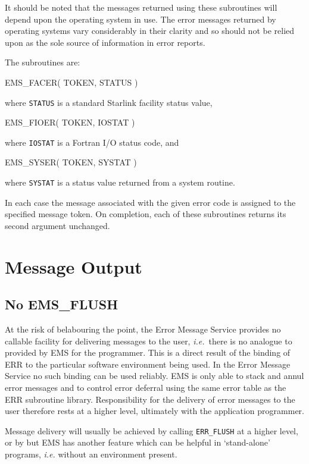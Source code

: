 \documentclass[twoside,11pt]{starlink}
\begin{document}
It should be noted that the messages returned using these subroutines
will depend upon the operating system in use.
The error messages returned by operating systems vary considerably in their
clarity and so should not be relied upon as the sole source of information
in error reports.

The subroutines are:
\begin{terminalv}
EMS_FACER( TOKEN, STATUS )
\end{terminalv}
where \texttt{STATUS} is a standard Starlink facility status value,
\begin{terminalv}
EMS_FIOER( TOKEN, IOSTAT )
\end{terminalv}
where \texttt{IOSTAT} is a Fortran I/O status code, and
\begin{terminalv}
EMS_SYSER( TOKEN, SYSTAT )
\end{terminalv}
where \texttt{SYSTAT} is a status value returned from a system routine.

In each case the message associated with the given error code is assigned to
the specified message token.
On completion, each of these subroutines returns its second argument
unchanged.

\section{Message Output}
\subsection{No EMS\_FLUSH}
At the risk of belabouring the point, the Error Message Service provides no
callable facility for delivering messages to the user, \textit{i.e.}\ there is
no analogue to
provided by EMS for the programmer.
This is a direct result of the binding of ERR to the particular
software environment being used.
In the Error Message Service no such binding can be used reliably.
EMS is only able to stack and annul error messages and to
control error deferral using the same error table as the ERR subroutine
library.
Responsibility for the delivery of error messages to the user therefore rests
at a higher level, ultimately with the application programmer.

Message delivery will usually be achieved by calling \texttt{ERR\_FLUSH} at a
higher level, or by
 but EMS has another feature which can be
helpful in `stand-alone' programs, \textit{i.e.} without an environment
present.
\end{document}
